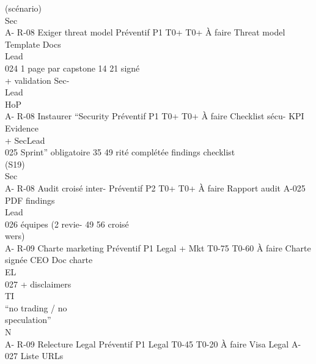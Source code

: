 \documentclass[12pt,landscape,a4paper]{article}
\begin{document}
(scénario)\\
Sec\\
A- R-08     Exiger threat model Préventif P1                T0+ T0+ À faire       Threat model    Template Docs\\
Lead\\
024         1 page par capstone                             14    21              signé\\
+ validation Sec-\\
Lead\\
HoP\\
A- R-08     Instaurer “Security Préventif P1                T0+ T0+ À faire       Checklist sécu- KPI     Evidence\\
+ SecLead\\
025         Sprint” obligatoire                             35    49              rité complétée findings checklist\\
(S19)\\
Sec\\
A- R-08     Audit croisé inter- Préventif P2                T0+ T0+ À faire       Rapport audit A-025        PDF findings\\
Lead\\
026         équipes (2 revie-                               49    56              croisé\\
wers)\\
A- R-09     Charte marketing Préventif P1       Legal + Mkt T0-75 T0-60 À faire   Charte signée   CEO        Doc charte\\
\vspace{0.5em}
\vspace{0.5em}
\vspace{0.5em}
\vspace{0.5em}
EL\\
027         + disclaimers\\
\vspace{0.5em}
\vspace{0.5em}
\vspace{0.5em}
\vspace{0.5em}
TI\\
“no trading / no\\
speculation”\\
\vspace{0.5em}
\vspace{0.5em}
\vspace{0.5em}
\vspace{0.5em}
N\\
A- R-09     Relecture Legal      Préventif P1   Legal       T0-45 T0-20 À faire   Visa Legal      A-027      Liste URLs\\
\end{document}
